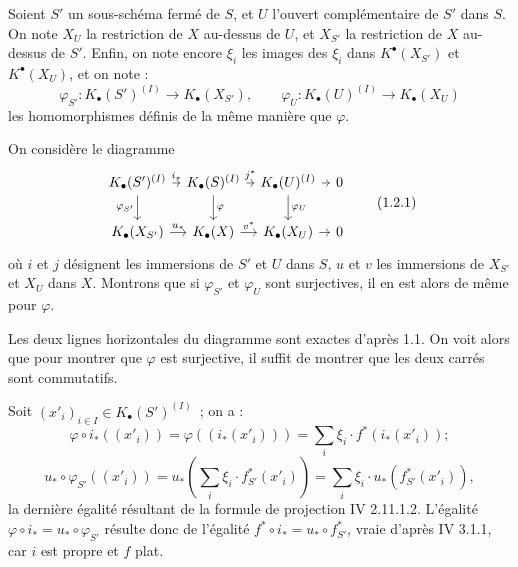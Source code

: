 
Soient $S'$ un sous-schéma fermé de $S$, et $U$ l'ouvert complémentaire de $S'$ dans $S$. On note $X_U$ la restriction de $X$ au-dessus de $U$, et $X_{S'}$ la restriction de $X$ au-dessus de $S'$. Enfin, on note encore $\xi_i$ les images des $\xi_i$ dans $K^{\bullet}(X_{S'})$ et $K^{\bullet}(X_U)$, et on note :
\[
\varphi_{S'}:K_\bullet(S')^{(I)}\to K_\bullet(X_{S'}),\qquad
\varphi_U:K_\bullet(U)^{(I)}\to K_\bullet(X_U)
\]
les homomorphismes définis de la même manière que $\varphi$.

On considère le diagramme
\[
\begin{tikzcd}[column sep=tiny]
K_\bullet(S')^{(I)} \arrow[r,"i_*"] \arrow[d,"\varphi_{S'}"'] & K_\bullet(S)^{(I)} \arrow[r,"j^*"] \arrow[d,"\varphi"] & K_\bullet(U)^{(I)} \arrow[r] \arrow[d,"\varphi_U"] & 0\\
K_\bullet(X_{S'}) \arrow[r,"u_*"] & K_\bullet(X) \arrow[r,"v^*"] & K_\bullet(X_U) \arrow[r] & 0
\end{tikzcd}\tag{1.2.1}
\]
où $i$ et $j$ désignent les immersions de $S'$ et $U$ dans $S$, $u$ et $v$ les immersions de $X_{S'}$ et $X_U$ dans $X$. Montrons que si $\varphi_{S'}$ et $\varphi_U$ sont surjectives, il en est alors de même pour $\varphi$.

Les deux lignes horizontales du diagramme sont exactes d'après 1.1. On voit alors que pour montrer que $\varphi$ est surjective, il suffit de montrer que les deux carrés sont commutatifs.

Soit $(x'_i)_{i\in I}\in K_\bullet(S')^{(I)}$~; on a :
\[
\varphi\circ i_*((x'_i))=\varphi((i_*(x'_i)))=\sum_i \xi_i\cdot f^*(i_*(x'_i));
\]
\[
u_*\circ\varphi_{S'}((x'_i))=u_*\left(\sum_i \xi_i\cdot f^*_{S'}(x'_i)\right)=\sum_i \xi_i\cdot u_*(f^*_{S'}(x'_i)),
\]
la dernière égalité résultant de la formule de projection IV 2.11.1.2. L'égalité $\varphi\circ i_*=u_*\circ\varphi_{S'}$ résulte donc de l'égalité $f^*\circ i_*=u_*\circ f^*_{S'}$, vraie d'après IV 3.1.1, car $i$ est
propre et $f$ plat.

